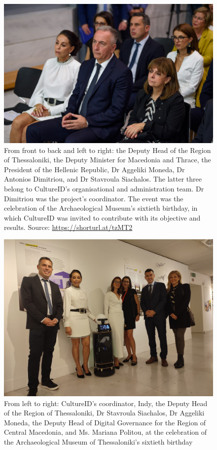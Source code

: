 \begin{figure}[H]\centering
  \includegraphics[scale=0.35]{images/cultureid/omg1.jpg}
  \caption{\small From front to back and left to right: the Deputy Head of the
           Region of Thessaloniki, the Deputy Minister for Macedonia and Thrace,
           the President of the Hellenic Republic, Dr Aggeliki Moneda, Dr
           Antonios Dimitriou, and Dr Stavroula Siachalos. The latter three
           belong to CultureID's organisational and administration team.
           Dr Dimitriou was the project's coordinator. The event was the
           celebration of the Archaeological Museum's sixtieth birthday, in
           which CultureID was invited to contribute with its objective and
           results.  Source: \url{https://shorturl.at/tzMT2}}
  \label{fig:cultureid_omg1}
\end{figure}
\begin{figure}[H]\centering
  \includegraphics[scale=0.2]{images/cultureid/omg2.jpg}
  \caption{\small From left to right: CultureID's coordinator, Indy, the Deputy
           Head of the Region of Thessaloniki, Dr Stavroula Siachalos, Dr
           Aggeliki Moneda, the Deputy Head of Digital Governance for the
           Region of Central Macedonia, and Ms. Mariana Politou, at the
           celebration of the Archaeological Museum of Thessaloniki's sixtieth
           birthday}
  \label{fig:cultureid_omg2}
\end{figure}


